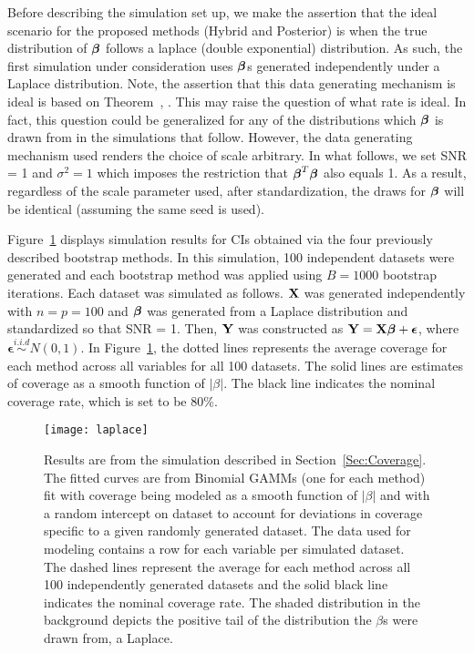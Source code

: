 Before describing the simulation set up, we make the assertion that the ideal scenario for the proposed methods (Hybrid and Posterior) is when the true distribution of $\boldsymbol{\beta}$ follows a laplace (double exponential) distribution. As such, the first simulation under consideration uses $\boldsymbol{\beta}$s generated independently under a Laplace distribution. Note, the assertion that this data generating mechanism is ideal is based on Theorem~, . This may raise the question of what rate is ideal. In fact, this question could be generalized for any of the distributions which $\boldsymbol{\beta}$ is drawn from in the simulations that follow. However, the data generating mechanism used renders the choice of scale arbitrary. In what follows, we set SNR = 1 and $\sigma^2 = 1$ which imposes the restriction that $\boldsymbol{\beta}^T\boldsymbol{\beta}$ also equals 1. As a result, regardless of the scale parameter used, after standardization, the draws for $\boldsymbol{\beta}$ will be identical (assuming the same seed is used).

Figure~\ref{Fig:laplace} displays simulation results for CIs obtained via the four previously described bootstrap methods. In this simulation, 100 independent datasets were generated and each bootstrap method was applied using $B = 1000$ bootstrap iterations. Each dataset was simulated as follows. $\mathbf{X}$ was generated independently with $n = p = 100$ and $\boldsymbol{\beta}$ was generated from a Laplace distribution and standardized so that SNR = 1. Then, $\mathbf{Y}$ was constructed as $\mathbf{Y} = \mathbf{X}\boldsymbol{\beta} + \boldsymbol{\epsilon}$, where $\boldsymbol{\epsilon} \overset{i.i.d}{\sim} N(0, 1)$. In Figure~\ref{Fig:laplace}, the dotted lines represents the average coverage for each method across all variables for all 100 datasets. The solid lines are estimates of coverage as a smooth function of $|\beta|$. The black line indicates the nominal coverage rate, which is set to be 80\%.

\begin{figure}[hbtp]
  \texttt{[image: laplace]}
  \caption{\label{Fig:laplace} Results are from the simulation described in Section~\ref{Sec:Coverage}. The fitted curves are from Binomial GAMMs (one for each method) fit with coverage being modeled as a smooth function of $|\beta|$ and with a random intercept on dataset to account for deviations in coverage specific to a given randomly generated dataset. The data used for modeling contains a row for each variable per simulated dataset. The dashed lines represent the average for each method across all 100 independently generated datasets and the solid black line indicates the nominal coverage rate. The shaded distribution in the background depicts the positive tail of the distribution the $\beta$s were drawn from, a Laplace.}
\end{figure}

